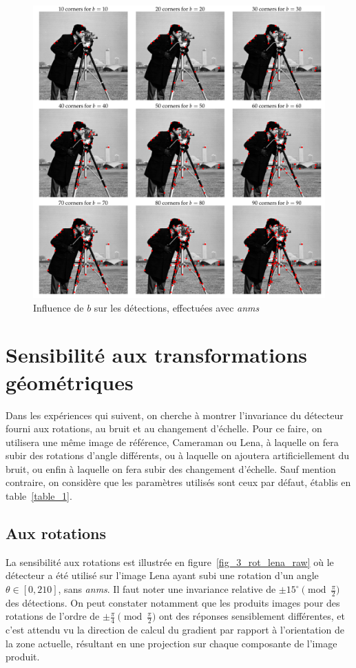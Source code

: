 \documentclass[12pt,a4paper,onecolumn]{article}
\begin{document}
\begin{figure}[H]
	\centering
	\includegraphics[width = 1.0\textwidth]{2_cameraman_b}
	\caption{Influence de \(b\) sur les détections, effectuées avec \textit{anms}}
	\label{fig_2_b}
\end{figure}


\section{Sensibilité aux transformations géométriques}

Dans les expériences qui suivent, on cherche à montrer l'invariance du détecteur fourni aux rotations, au bruit et au changement d'échelle. Pour ce faire, on utilisera une même image de référence, Cameraman ou Lena, à laquelle on fera subir des rotations d'angle différents, ou à laquelle on ajoutera artificiellement du bruit, ou enfin à laquelle on fera subir des changement d'échelle. Sauf mention contraire, on considère que les paramètres utilisés sont ceux par défaut, établis en table~\ref{table_1}.


\subsection{Aux rotations}

La sensibilité aux rotations est illustrée en figure~\ref{fig_3_rot_lena_raw} où le détecteur a été utilisé sur l'image Lena ayant subi une rotation d'un angle \(\theta \in [0, 210]\), sans \textit{anms}. Il faut noter une invariance relative de \( \pm 15^{\circ}\pmod{\frac{\pi}{2}}\) des détections. On peut constater notamment que les produits images pour des rotations de l'ordre de \( \pm \frac{\pi}{4}\pmod{\frac{\pi}{2}}\) ont des réponses sensiblement différentes, et c'est attendu vu la direction de calcul du gradient par rapport à l'orientation de la zone actuelle, résultant en une projection sur chaque composante de l'image produit.
\end{document}
